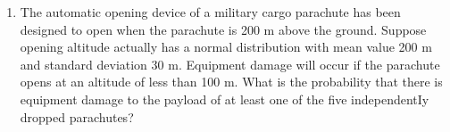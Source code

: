 \documentclass[12pt]{article}
\begin{document}
\begin{enumerate}

\item  \label{Ch35_Normal_Parachute}The automatic opening device of a military cargo parachute has been designed to open when the parachute is 200 m above the ground. Suppose opening altitude actually has a normal distribution with mean value 200 m and standard deviation 30 m. Equipment damage will occur if the parachute opens at an altitude of less than 100 m. What is the probability that there is equipment damage to the payload of at least one of the five independentIy dropped parachutes?  




%
%
%
%
%
%
%



\end{enumerate}  %
\end{document}
